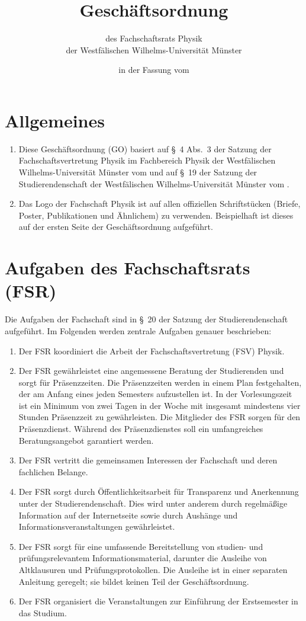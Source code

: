 \documentclass[
	a4paper,
	12pt,
	oneside,
	parskip=half-,
	pagesize,
	headsepline,
	german,
	ngerman
]{scrartcl}
\title{Geschäftsordnung}
\subtitle{des Fachschaftsrats Physik\\
der Westfälischen Wilhelms-Universität Münster}
\date{in der Fassung vom \formatdate{17}{12}{2014}}
\author{}
\begin{document}
\maketitle

\section{Allgemeines}
\label{sec:Allgemeines}
\begin{enumerate}
	\item Diese Geschäftsordnung (GO) basiert auf §~4 Abs.~3 der Satzung der Fachschaftsvertretung Physik im Fachbereich Physik der Westfälischen Wilhelms-Universität Münster vom  und auf §~19 der Satzung der Studierendenschaft der Westfälischen Wilhelms-Universität Münster vom .
	\item Das Logo der Fachschaft Physik ist auf allen offiziellen Schriftstücken (Briefe, Poster, Publikationen und Ähnlichem) zu verwenden. Beispielhaft ist dieses auf der ersten Seite der Geschäftsordnung aufgeführt.
\end{enumerate}

\section{Aufgaben des Fachschaftsrats (FSR)}
\label{sec:Aufgaben}
Die Aufgaben der Fachschaft sind in §~20 der Satzung der Studierendenschaft aufgeführt. Im Folgenden werden zentrale Aufgaben genauer beschrieben:
\begin{enumerate}
	\item Der FSR koordiniert die Arbeit der Fachschaftsvertretung (FSV) Physik.
	\item Der FSR gewährleistet eine angemessene Beratung der Studierenden und sorgt für Präsenzzeiten. Die Präsenzzeiten werden in einem Plan festgehalten, der am Anfang eines jeden Semesters aufzustellen ist. In der Vorlesungszeit ist ein Minimum von zwei Tagen in der Woche mit insgesamt mindestens vier Stunden Präsenzzeit zu gewährleisten. Die Mitglieder des FSR sorgen für den Präsenzdienst. Während des Präsenzdienstes soll ein umfangreiches Beratungsangebot garantiert werden.
	\item Der FSR vertritt die gemeinsamen Interessen der Fachschaft und deren fachlichen Belange.
	\item Der FSR sorgt durch Öffentlichkeitsarbeit für Transparenz und Anerkennung unter der Studierendenschaft. Dies wird unter anderem durch regelmäßige Information auf der Internetseite sowie durch Aushänge und Informationsveranstaltungen gewährleistet.
	\item Der FSR sorgt für eine umfassende Bereitstellung von studien- und prüfungsrelevantem Informationsmaterial, darunter die Ausleihe von Altklausuren und Prüfungsprotokollen. Die Ausleihe ist in einer separaten Anleitung geregelt; sie bildet keinen Teil der Geschäftsordnung.
	\item Der FSR organisiert die Veranstaltungen zur Einführung der Erstsemester in das Studium.
\end{enumerate}
\end{document}
